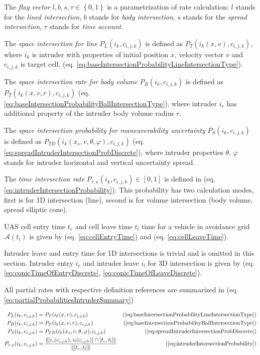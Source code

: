 \noindent The \emph{flag vector} $l,b,s,\tau \in \left\{0,1\right\}$ is a parametrization  of rate calculation: $l$ stands for the \emph{lined intersection}, $b$ stands for \emph{body intersection}, $s$ stands for the \emph{spread intersection}, $\tau$ stands for \emph{time account}. 

The \emph{space intersection for line} $P_L(i_k,c_{i,j,k})$ is defined as $P_T(i_k({x},{v}),c_{i,j,k})$, where $i_k$ is intruder with properties of initial position ${x}$, velocity vector ${v}$ and $c_{i,j,k}$ is target cell. (eq. \ref{eq:baseIntersectionProbabilityLineIntersectionType}). 

The \emph{space intersection rate for body volume} $P_B(i_k,c_{i,j,k})$ is defined as $P_T(i_k({x},{v},r),c_{i,j,k})$ (eq. \ref{eq:baseIntersectionProbabilityBallIntersectionType}), where intruder $i_r$ has additional property of the intruder body volume radius $r$. 

The \emph{space intersection probability for maneuverability uncertainty} $P_S(i_k,c_{i,j,k})$ is defined as $P_{TD}(i_k({x}_s,{v},\theta,\varphi),c_{i,j,k})$ (eq. \ref{eq:spreadIntruderIntersectionProbDiscrete}), where intruder properties $\theta$, $\varphi$ stands for intruder horizontal and vertical uncertainty spread.

The \emph{time intersection rate} $P_{\tau,x}(i_k,c_{i,j,k})\in[0,1]$ is defined in (eq. \ref{eq:intruderIntersectionProbability}). This probability has two calculation modes, first is for 1D intersection (line), second is for volume intersection (body volume, spread elliptic cone).  

UAS cell entry time $t_e$ and cell leave time  $t_l$ time for a vehicle in avoidance grid $\mathscr{A}(t_i)$ is given by (eq. \ref{eq:cellEntryTime}) and (eq. \ref{eq:cellLeaveTime}). 

Intruder leave and entry time for 1D intersections is trivial and is omitted in this section. Intruder entry $i_e$ and intruder leave $i_l$ for 3D intersection is given by (eq. \ref{eq:conicTimeOfEntryDiscrete}, \ref{eq:conicTimeOfLeaveDiscrete}). 

All partial rates with respective definition references are summarized in (eq. \ref{eq:partialProbabilitiesIntruderSummary})

\begin{equation}\label{eq:partialProbabilitiesIntruderSummary}
    \begin{aligned}
        P_L(i_k,c_{i,j,k}) &= P_T(i_k({x},{v}),c_{i,j,k}) &(\ref{eq:baseIntersectionProbabilityLineIntersectionType})\\
        P_B(i_k,c_{i,j,k}) &= P_T(i_k({x},{v},r),c_{i,j,k}) &(\ref{eq:baseIntersectionProbabilityBallIntersectionType})\\
        P_S(i_k,c_{i,j,k}) &= P_{TD}(i_k({x}_s,{v},\theta,\varphi),c_{i,j,k}) &(\ref{eq:spreadIntruderIntersectionProbDiscrete})\\
        P_{\tau,x}(i_k,c_{i,j,k})&=\frac{\left\lVert[i_e(c_{i,j,k}),i_l(c_{i,j,k})]\cap [t_e,t_l]\right\rVert}{\left\lVert[t_e,t_l]\right\rVert}& (\ref{eq:intruderIntersectionProbability})\\
    \end{aligned}
\end{equation}

